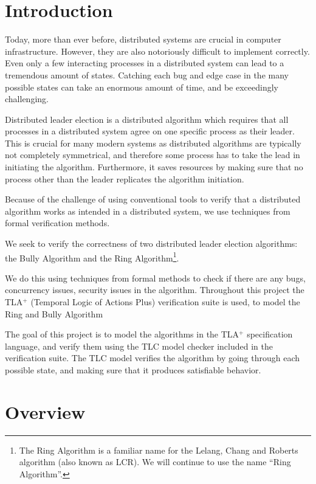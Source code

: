 \documentclass{report}
\begin{document}
\tableofcontents

\chapter{Introduction}


Today, more than ever before, distributed systems are crucial in computer infrastructure. However, they are also notoriously difficult to implement correctly. Even only a few interacting processes in a distributed system can lead to a tremendous amount of states. Catching each bug and edge case in the many possible states can take an enormous amount of time, and be exceedingly challenging.

Distributed leader election is a distributed algorithm which requires that all processes in a distributed system agree on one specific process as their leader. This is crucial for many modern systems as distributed algorithms are typically not completely symmetrical, and therefore some process has to take the lead in initiating the algorithm. Furthermore, it saves resources by making sure that no process other than the leader replicates the algorithm initiation.

Because of the challenge of using conventional tools to verify that a distributed algorithm works as intended in a distributed system, we use techniques from formal verification methods.

We seek to verify the correctness of two distributed leader election algorithms: the Bully Algorithm and the Ring Algorithm\footnote{The Ring Algorithm is a familiar name for the Lelang, Chang and Roberts algorithm (also known as LCR). We will continue to use the name ``Ring Algorithm''.}.


We do this using techniques from formal methods to check if there are any bugs, concurrency issues, security issues in the algorithm. Throughout this project the TLA$^{+}$ (Temporal Logic of Actions Plus) verification suite is used, to model the Ring and Bully Algorithm


The goal of this project is to model the algorithms in the TLA$^{+}$ specification language, and verify them using the TLC model checker included in the verification suite. The TLC model verifies the algorithm by going through each possible state, and making sure that it produces satisfiable behavior.







\chapter{Overview}
\end{document}
